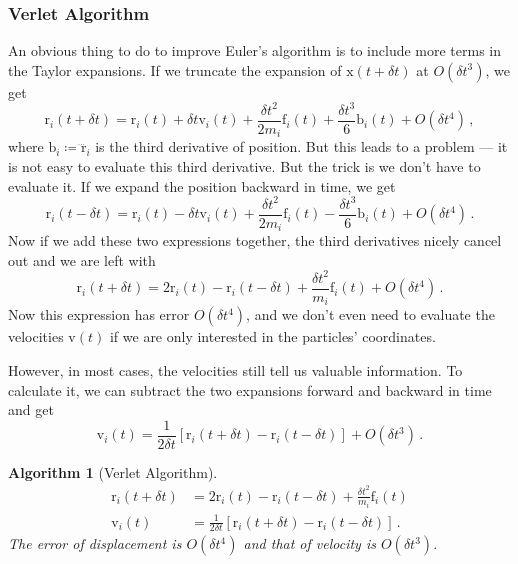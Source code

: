 \documentclass{article}
\theoremstyle{plain}\theoremheaderfont{\normalfont\itshape}\theorembodyfont{\rmfamily}\theoremseparator{.}\newtheorem*{rem}{Remark}\newtheorem*{ex}{Example}\newtheorem*{proof}{Proof}\newtheorem*{altp}{Alternative proof}
\theoremstyle{plain}\theoremheaderfont{\normalfont\bfseries}\theorembodyfont{\rmfamily}\theoremseparator{.}\newtheorem{thm}{Theorem}[section]\newtheorem{lem}[thm]{Lemma}\newtheorem{prop}[thm]{Proposition}\newtheorem*{cor}{Corollary}\newtheorem{defn}[thm]{Definition}\newtheorem{clm}[thm]{Claim}\newtheorem{clminproof}{Claim}\newtheorem{alg}[thm]{Algorithm}\newtheorem{hyp}[thm]{Hypothesis}\newtheorem{law}[thm]{Law}
\theoremstyle{break}\theoremheaderfont{\normalfont\itshape}\theorembodyfont{\rmfamily}\theoremseparator{.\medskip}\newtheorem*{proofskip}{Proof}\newtheorem*{exs}{Examples}\newtheorem*{rems}{Remarks}
\theoremstyle{break}\theoremheaderfont{\normalfont\bfseries}\theorembodyfont{\rmfamily}\theoremseparator{.\medskip}\newtheorem{lemskip}[thm]{Lemma}\newtheorem{defnskip}[thm]{Definition}\newtheorem{propskip}[thm]{Proposition}\newtheorem{thmskip}[thm]{Theorem}
\numberwithin{equation}{section}
\newcommand{\vb}[1]{\bm{\mathrm{#1}}}
\begin{document}
    \subsubsection{Verlet Algorithm}
    An obvious thing to do to improve Euler's algorithm is to include more terms in the Taylor expansions. If we truncate the expansion of \(\vb{x}(t+\delta t)\) at \(O(\delta t^3)\), we get
    \begin{equation}
        \vb{r}_i(t+\delta t)=\vb{r}_i(t)+\delta t\vb{v}_i(t)+\frac{\delta t^2}{2m_i}\vb{f}_i(t)+\frac{\delta t^3}{6}\vb{b}_i(t)+O(\delta t^4)\,,
    \end{equation}
    where \(\vb{b}_i\coloneqq\dddot{\vb{r}}_i\) is the third derivative of position. But this leads to a problem --- it is not easy to evaluate this third derivative. But the trick is we don't have to evaluate it. If we expand the position backward in time, we get
    \begin{equation}
        \vb{r}_i(t-\delta t)=\vb{r}_i(t)-\delta t\vb{v}_i(t)+\frac{\delta t^2}{2m_i}\vb{f}_i(t)-\frac{\delta t^3}{6}\vb{b}_i(t)+O(\delta t^4)\,.
    \end{equation}
    Now if we add these two expressions together, the third derivatives nicely cancel out and we are left with
    \begin{equation}
        \vb{r}_i(t+\delta t)=2\vb{r}_i(t)-\vb{r}_i(t-\delta t)+\frac{\delta t^2}{m_i}\vb{f}_i(t)+O(\delta t^4)\,.
    \end{equation}
    Now this expression has error \(O(\delta t^4)\), and we don't even need to evaluate the velocities \(\vb{v}(t)\) if we are only interested in the particles' coordinates.

    However, in most cases, the velocities still tell us valuable information. To calculate it, we can subtract the two expansions forward and backward in time and get
    \begin{equation}
        \vb{v}_i(t)=\frac{1}{2\delta t}[\vb{r}_i(t+\delta t)-\vb{r}_i(t-\delta t)]+O(\delta t^3)\,.
    \end{equation}

    \begin{alg}[Verlet Algorithm]
        \begin{align}
            \vb{r}_i(t+\delta t)&=2\vb{r}_i(t)-\vb{r}_i(t-\delta t)+\frac{\delta t^2}{m_i}\vb{f}_i(t)\label{verlet_position}\\
            \vb{v}_i(t)&=\frac{1}{2\delta t}[\vb{r}_i(t+\delta t)-\vb{r}_i(t-\delta t)]\,.
        \end{align}
        The error of displacement is \(O(\delta t^4)\) and that of velocity is \(O(\delta t^3)\).
    \end{alg}
\end{document}
